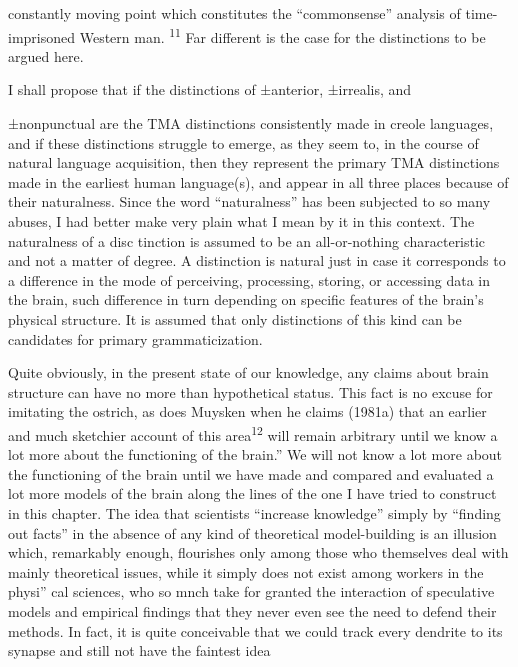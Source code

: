 
constantly moving point which constitutes the ``commonsense'' analysis of time-imprisoned Western man. \textsuperscript{11} Far different is the case for the distinctions to be argued here.

I shall propose that if the distinctions of ±anterior, ±irrealis, and

±nonpunctual are the TMA distinctions consistently made in creole languages, and if these distinctions struggle to emerge, as they seem to, in the course of natural language acquisition, then they represent the primary TMA distinctions made in the earliest human language(s), and appear in all three places because of their naturalness. Since the word ``naturalness'' has been subjected to so many abuses, I had better make very plain what I mean by it in this context. The naturalness of a disc tinction is assumed to be an all-or-nothing characteristic and not a matter of degree. A distinction is natural just in case it corresponds to a difference in the mode of perceiving, processing, storing, or access\-ing data in the brain, such difference in turn depending on specific features of the brain's physical structure. It is assumed that only dis\-tinctions of this kind can be candidates for primary grammaticization.

Quite obviously, in the present state of our knowledge, any claims about brain structure can have no more than hypothetical status. This fact is no excuse for imitating the ostrich, as does Muysken when he claims (1981a) that an earlier and much sketchier account of this area\textsuperscript{12} {\textquotedbl}will remain arbitrary until we know a lot more about the functioning of the brain.'' We will not know a lot more about the functioning of the brain until we have made and compared and evalu\-ated a lot more models of the brain along the lines of the one I have tried to construct in this chapter. The idea that scientists ``increase knowledge'' simply by ``finding out facts'' in the absence of any kind of theoretical model-building is an illusion which, remarkably enough, flourishes only among those who themselves deal with mainly theore\-tical issues, while it simply does not exist among workers in the physi'' cal sciences, who so mnch take for granted the interaction of specula\-tive models and empirical findings that they never even see the need to defend their methods. In fact, it is quite conceivable that we could track every dendrite to its synapse and still not have the faintest idea

